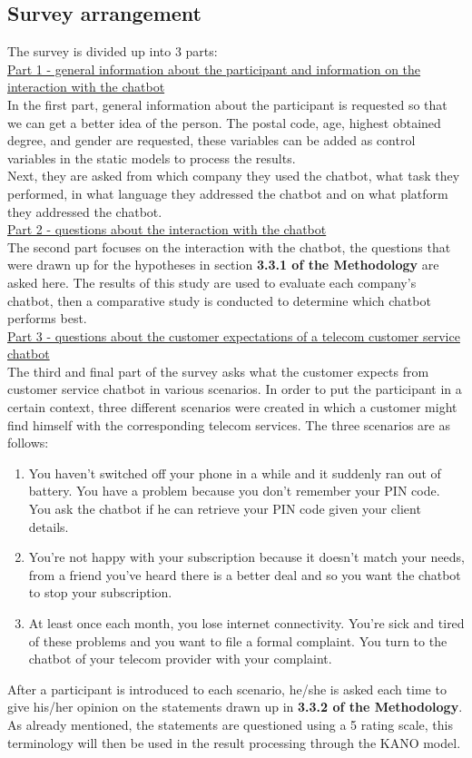 \subsection{Survey arrangement}
The survey is divided up into 3 parts:\\
\break
\ul{Part 1 - general information about the participant and information on the interaction with the chatbot}\\
\break
In the first part, general information about the participant is requested so that we can get a better idea of the person. The postal code, age, highest obtained degree, and gender are requested, these variables can be added as control variables in the static models to process the results.\\
\break
Next, they are asked from which company they used the chatbot, what task they performed, in what language they addressed the chatbot and on what platform they addressed the chatbot.\\
\break
\ul{Part 2 - questions about the interaction with the chatbot}\\
\break
The second part focuses on the interaction with the chatbot, the questions that were drawn up for the hypotheses in section \textbf{3.3.1 of the Methodology} are asked here. The results of this study are used to evaluate each company's chatbot, then a comparative study is conducted to determine which chatbot performs best.\\
\break
\ul{Part 3 - questions about the customer expectations of a telecom customer service chatbot}\\
\break
The third and final part of the survey asks what the customer expects from customer service chatbot in various scenarios. In order to put the participant in a certain context, three different scenarios were created in which a customer might find himself with the corresponding telecom services. The three scenarios are as follows:
\begin{enumerate}
	\item You haven't switched off your phone in a while and it suddenly ran out of battery. You have a problem because you don't remember your PIN code. You ask the chatbot if he can retrieve your PIN code given your client details. 
	\item You're not happy with your subscription because it doesn't match your needs, from a friend you've heard there is a better deal and so you want the chatbot to stop your subscription.
	\item At least once each month, you lose internet connectivity. You're sick and tired of these problems and you want to file a formal complaint. You turn to the chatbot of your telecom provider with your complaint.
\end{enumerate}
After a participant is introduced to each scenario, he/she is asked each time to give his/her opinion on the statements drawn up in \textbf{3.3.2 of the Methodology}. As already mentioned, the statements are questioned using a 5 rating scale, this terminology will then be used in the result processing through the KANO model.

